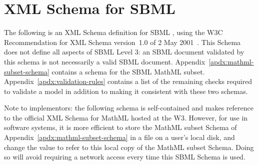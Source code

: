 
\section{XML Schema for SBML}
\label{apdx:schema}

The following is an XML Schema definition for SBML \thisLV, using
the W3C Recommendation for XML Schema version~1.0 of 2 May
2001~\citep{biron:2000,fallside:2000,thompson:2000}.  This Schema
does not define all aspects of SBML Level 3: an SBML document
validated by this schema is not necessarily a valid SBML \thisLV
document.  Appendix~\ref{apdx:mathml-subset-schema} contains a
schema for the SBML MathML subset.
Appendix~\ref{apdx:validation-rules} contains a list of the
remaining checks required to validate a model in addition
to making it consistent with these two schemas.

Note to implementors: the following schema is
self-contained and makes reference to the official XML Schema for
MathML hosted at the W3.  However, for use in software systems, it
is more efficient to store the MathML subset Schema of
Appendix~\ref{apdx:mathml-subset-schema} in a file on a user's
local disk, and change the  value
 
to refer to this local copy of the MathML subset Schema.
Doing so will avoid requiring a network access every time this
SBML Schema is used.

